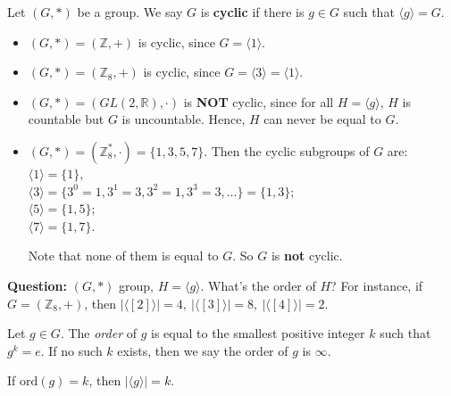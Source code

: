 \begin{definition}
Let $(G, *)$ be a group. We say $G$ is \textbf{cyclic} if there is $g \in G$ such that $\langle g \rangle = G$.
\end{definition}


\begin{example}
\begin{itemize}
    \item $(G, *) = (\mathbb{Z}, +)$ is cyclic, since $G = \langle 1 \rangle$.
    \item $(G, *) = (\mathbb{Z}_8, +)$ is cyclic, since $G = \langle 3 \rangle = \langle 1 \rangle$.
    \item $(G, *) = (GL(2, \mathbb{R}), \cdot)$ is \textbf{NOT} cyclic, since for all $H = \langle g \rangle$, $H$ is countable but $G$ is uncountable. 
    Hence, $H$ can never be equal to $G$.
    
    \item $(G, *) = (\mathbb{Z}_8^*, \cdot) = \{ 1, 3, 5, 7 \}$. Then the cyclic subgroups of $G$ are: \\
    $\langle 1 \rangle = \{ 1 \}$,\\ 
    $\langle 3 \rangle = \{ 3^0=1, 3^1=3, 3^2=1, 3^3=3, \dots \} = \{ 1, 3 \}$;\\
    $\langle 5 \rangle = \{ 1, 5 \}$; \\
    $\langle 7 \rangle = \{ 1, 7 \}$. 
    
    Note that none of them is equal to $G$. So $G$ is \textbf{not} cyclic.
\end{itemize}
\end{example}

\noindent \textbf{Question:} $(G, *)$ group, $H = \langle g \rangle$. What's the order of $H$? For instance, if $G = (\mathbb{Z}_8, +)$, then $ |\langle [2] \rangle| = 4, \ |\langle [3] \rangle| = 8, \ |\langle [4] \rangle| = 2$.
\begin{definition}[Order] 
Let $g \in G$. The \textit{order} of $g$ is equal to the smallest positive integer $k$ such that $g^k = e$. If no such $k$ exists, then we say the order of $g$ is $\infty$.
\end{definition}

\begin{proposition} \label{prop:ordg}
If $\mathrm{ord}(g) = k$, then $|\langle g \rangle| = k$.
\end{proposition}

